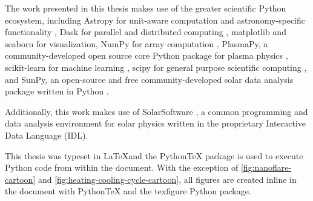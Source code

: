 The work presented in this thesis makes use of the greater scientific Python ecosystem, including Astropy for unit-aware computation and astronomy-specific functionality \citep{the_astropy_collaboration_astropy_2018}, Dask for parallel and distributed computing \citep{rocklin_dask_2015}, matplotlib \citep{hunter_matplotlib_2007} and seaborn \citep{waskom_seaborn_2018} for visualization, NumPy for array computation \citep{oliphant_guide_2006}, PlasmaPy, a community-developed open source core Python package for plasma physics \citep{plasmapy_community_2018_1238132}, scikit-learn for machine learning \citep{pedregosa_scikit-learn_2011}, scipy for general purpose scientific computing \citep[e.g. interpolation, curve fitting, special functions][]{jones_scipy_2001}, and SunPy, an open-source and free community-developed solar data analysis package written in Python \citep{sunpy_community_sunpypython_2015}.

Additionally, this work makes use of SolarSoftware \citep[SSW,][]{freeland_data_1998}, a common programming and data analysis environment for solar physics written in the proprietary Interactive Data Language (IDL).

This thesis was typeset in \LaTeX and the Python\TeX{} package is used to execute Python code from within the document. With the exception of \autoref{fig:nanoflare-cartoon} and \autoref{fig:heating-cooling-cycle-cartoon}, all figures are created inline in the document with Python\TeX{} and the texfigure Python package.

